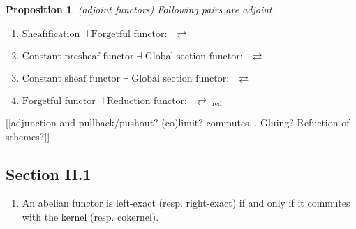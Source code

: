 \documentclass{article}
\theoremstyle{plain}
\newtheorem{prop}[lem]{Proposition}
\theoremstyle{definition}
\DeclareMathOperator{\Ab}{\underline{\textsf{Ab}}}
\DeclareMathOperator{\PSh}{\underline{\textsf{PSh}}}
\DeclareMathOperator{\red}{red}
\DeclareMathOperator{\Sch}{\underline{\textsf{Sch}}}
\DeclareMathOperator{\Sh}{\underline{\textsf{Sh}}}
\begin{document}
\begin{tcolorbox}
    \begin{prop}(adjoint functors)
        Following pairs are adjoint.
        \begin{enumerate}[label = \arabic*.]
            \item $\text{Sheafification} \dashv \text{Forgetful functor}: \PSh \rightleftarrows \Sh$
            \item $\text{Constant presheaf functor} \dashv \text{Global section functor}: \Ab \rightleftarrows \PSh$
            \item[1+2.] $\text{Constant sheaf functor} \dashv \text{Global section functor}: \Ab \rightleftarrows \Sh$
            \item $\text{Forgetful functor} \dashv \text{Reduction functor}: \Sch \rightleftarrows \Sch_{\red}$
        \end{enumerate}
    \end{prop}
\end{tcolorbox}

[[adjunction and pullback/pushout? (co)limit? commutes... Gluing? Refuction of schemes?]]

\subsection*{Section II.1}

\begin{enumerate}[label = \arabic*.]
    \item An abelian functor is left-exact (resp. right-exact) if and only if it commutes with the kernel (resp. cokernel).
\end{enumerate}
\end{document}

